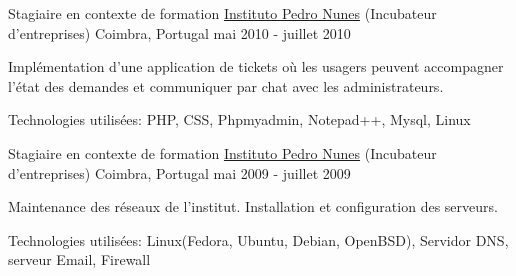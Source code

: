 \begin{cventries}

\cventry
{Stagiaire en contexte de formation} %
{\href{https://www.ipn.pt/}{Instituto Pedro Nunes} (Incubateur d'entreprises)} %
{Coimbra, Portugal} %
{mai 2010 - juillet 2010} %
{ %
\begin{cvitems}
\item {Implémentation d’une application de tickets où les usagers peuvent accompagner l'état des demandes et communiquer par chat avec les administrateurs.}
\item{Technologies utilisées: PHP, CSS, Phpmyadmin, Notepad++, Mysql, Linux }
\end{cvitems}
}


\cventry
{Stagiaire en contexte de formation} %
{\href{https://www.ipn.pt/}{Instituto Pedro Nunes} (Incubateur d'entreprises)} %
{Coimbra, Portugal} %
{mai 2009 - juillet 2009} %
{ %
\begin{cvitems}
\item {Maintenance des réseaux de l'institut. Installation et configuration des serveurs.}
\item{Technologies utilisées: Linux(Fedora, Ubuntu, Debian, OpenBSD), Servidor DNS, serveur Email, Firewall}
\end{cvitems}
}




\end{cventries}
